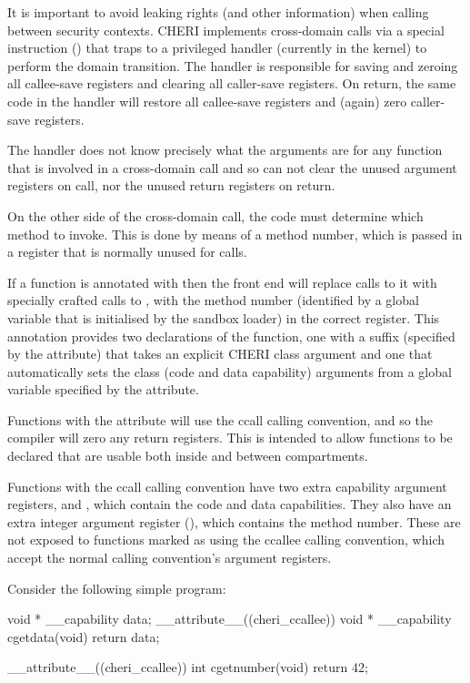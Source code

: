 It is important to avoid leaking rights (and other information) when calling between security contexts.  CHERI implements cross-domain calls via a special instruction () that traps to a privileged handler (currently in the kernel) to perform the domain transition.  The handler is responsible for saving and zeroing all callee-save registers and clearing all caller-save registers.  On return, the same code in the handler will restore all callee-save registers and (again) zero caller-save registers.

The handler does not know precisely what the arguments are for any function that is involved in a cross-domain call and so can not clear the unused argument registers on call, nor the unused return registers on return.

On the other side of the cross-domain call, the code must determine which method to invoke.  This is done by means of a method number, which is passed in a register that is normally unused for calls.

If a function is annotated with  then the front end will replace calls to it with specially crafted calls to , with the method number (identified by a global variable that is initialised by the sandbox loader) in the correct register.
This annotation provides two declarations of the function, one with a suffix (specified by the  attribute) that takes an explicit CHERI class argument and one that automatically sets the class (code and data capability) arguments from a global variable specified by the  attribute.

Functions with the  attribute will use the ccall calling convention, and so the compiler will zero any return registers.  This is intended to allow functions to be declared that are usable both inside and between compartments.

Functions with the ccall calling convention have two extra capability argument registers,  and , which contain the code and data capabilities.  
They also have an extra integer argument register (), which contains the method number.  These are not exposed to functions marked as using the ccallee calling convention, which accept the normal calling convention's argument registers.  

Consider the following simple program:

\begin{csnippet}
void * __capability data;
__attribute__((cheri_ccallee))
void * __capability cgetdata(void)
{
	return data;
}

__attribute__((cheri_ccallee))
int cgetnumber(void)
{
	return 42;
}
\end{csnippet}

